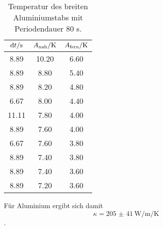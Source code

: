 \begin{table}

	\centering

	\caption{Temperatur des breiten Aluminiumstabs mit Periodendauer 80 s.}


	\begin{tabular}{S[table-format=3.2] S[table-format=3.2]S[table-format=3.2]}

		\toprule

		{$\mathrm{d}t/\si[per-mode=reciprocal]{\second}$}&{$A_\text{nah}/\si[per-mode=reciprocal]{\kelvin}$}&{$A_\text{fern}/\si[per-mode=reciprocal]{\kelvin}$} \\

		\midrule

		8.89 & 10.20 & 6.60 \\

		8.89 & 8.80 & 5.40 \\

		8.89 & 8.20 & 4.80 \\

		6.67 & 8.00 & 4.40 \\

		11.11 & 7.80 & 4.00 \\

		8.89 & 7.60 & 4.00 \\

		6.67 & 7.60 & 3.80 \\

		8.89 & 7.40 & 3.80 \\

		8.89 & 7.40 & 3.60 \\

		8.89 & 7.20 & 3.60 \\

		\bottomrule

	\end{tabular}

	\label{tab:tab3}

\end{table}

Für Aluminium ergibt sich damit \[\kappa = \SI{205(41)}{\watt\per\metre\per\kelvin}\].

